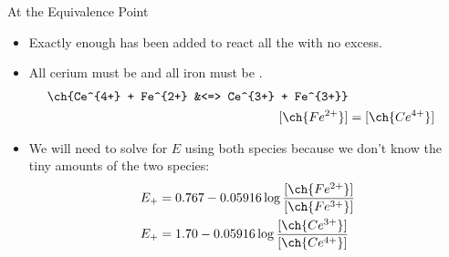 \documentclass[notes=show]{beamer}
\begin{document}
\begin{frame}{At the Equivalence Point}
	\begin{itemize}
		\item Exactly enough  has been added to react all
			the  with \alert{no excess}.
		\item All cerium \alert{must} be  and all iron
			\alert{must} be .
			\begin{align*}
				\ch{Ce^{4+} + Fe^{2+} &<=> Ce^{3+} + Fe^{3+}} \\
				[\ch{Fe^{2+}}] &= [\ch{Ce^{4+}}]
			\end{align*}
		\item We will need to solve for $E$ using both species because
			we don't know the tiny amounts of the two species:
			\begin{align*}
				E_+ &= 0.767 - 0.05916 \log
				\frac{[\ch{Fe^{2+}}]}{[\ch{Fe^{3+}}]} \\
				E_+ &= 1.70 - 0.05916 \log
				\frac{[\ch{Ce^{3+}}]}{[\ch{Ce^{4+}}]}
			\end{align*}
	\end{itemize}



\end{frame}
\end{document}
